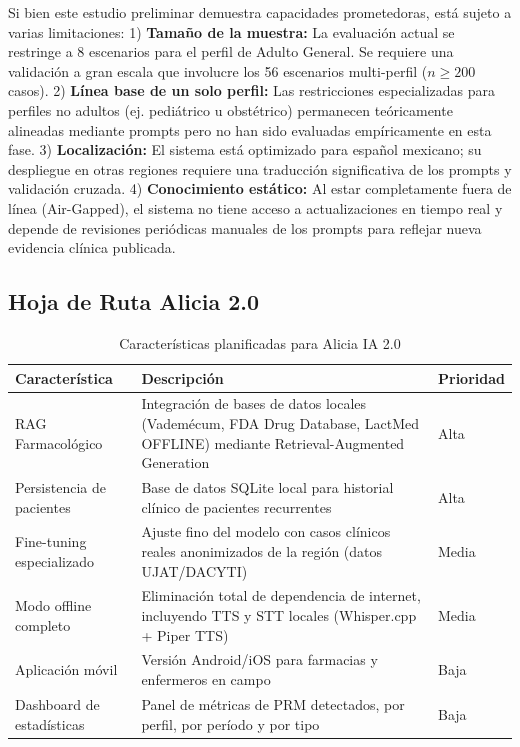 \documentclass[12pt,a4paper]{article}
\begin{document}
Si bien este estudio preliminar demuestra capacidades prometedoras, está sujeto a varias limitaciones:
1) \textbf{Tamaño de la muestra:} La evaluación actual se restringe a 8 escenarios para el perfil de Adulto General. Se requiere una validación a gran escala que involucre los 56 escenarios multi-perfil ($n \geq 200$ casos).
2) \textbf{Línea base de un solo perfil:} Las restricciones especializadas para perfiles no adultos (ej. pediátrico u obstétrico) permanecen teóricamente alineadas mediante prompts pero no han sido evaluadas empíricamente en esta fase.
3) \textbf{Localización:} El sistema está optimizado para español mexicano; su despliegue en otras regiones requiere una traducción significativa de los prompts y validación cruzada.
4) \textbf{Conocimiento estático:} Al estar completamente fuera de línea (Air-Gapped), el sistema no tiene acceso a actualizaciones en tiempo real y depende de revisiones periódicas manuales de los prompts para reflejar nueva evidencia clínica publicada.

\subsection{Hoja de Ruta Alicia 2.0}

\begin{table}[H]
  \centering
  \caption{Características planificadas para Alicia IA 2.0}
  \begin{tabularx}{\textwidth}{lXl}
    \toprule
    \textbf{Característica} & \textbf{Descripción} & \textbf{Prioridad} \\
    \midrule
    RAG Farmacológico & Integración de bases de datos locales (Vademécum, FDA Drug Database, LactMed OFFLINE) mediante Retrieval-Augmented Generation & Alta \\
    \midrule
    Persistencia de pacientes & Base de datos SQLite local para historial clínico de pacientes recurrentes & Alta \\
    \midrule
    Fine-tuning especializado & Ajuste fino del modelo con casos clínicos reales anonimizados de la región (datos UJAT/DACYTI) & Media \\
    \midrule
    Modo offline completo & Eliminación total de dependencia de internet, incluyendo TTS y STT locales (Whisper.cpp + Piper TTS) & Media \\
    \midrule
    Aplicación móvil & Versión Android/iOS para farmacias y enfermeros en campo & Baja \\
    \midrule
    Dashboard de estadísticas & Panel de métricas de PRM detectados, por perfil, por período y por tipo & Baja \\
    \bottomrule
  \end{tabularx}
\end{table}
\end{document}
